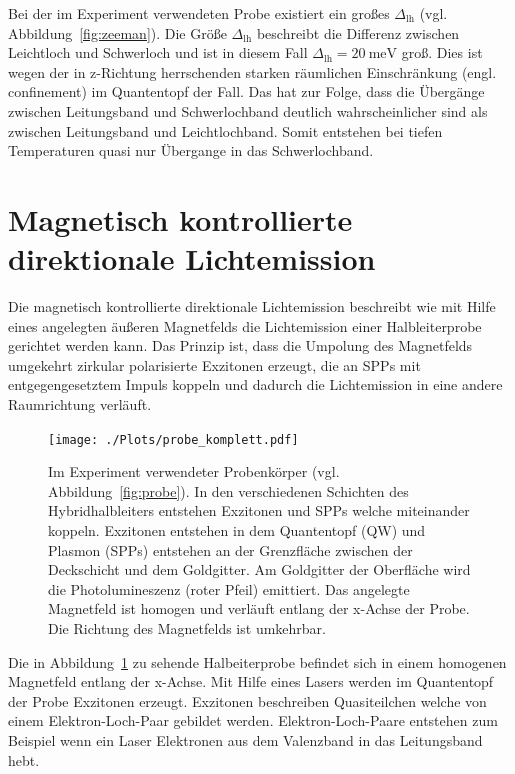 Bei der im Experiment verwendeten Probe existiert ein großes $\Delta_\text{lh}$ (vgl. Abbildung~\ref{fig:zeeman}).
Die Größe $\Delta_\text{lh}$ beschreibt die Differenz zwischen Leichtloch und Schwerloch und ist
in diesem Fall $\Delta_\text{lh}= \SI{20}{\milli\eV}$ groß.
Dies ist wegen der in z-Richtung herrschenden starken räumlichen Einschränkung (engl. confinement) im Quantentopf der Fall.
Das hat zur Folge, dass die Übergänge zwischen Leitungsband und Schwerlochband deutlich
wahrscheinlicher sind als zwischen Leitungsband und Leichtlochband. Somit entstehen bei tiefen Temperaturen quasi nur 
Übergange in das Schwerlochband.


\section{Magnetisch kontrollierte direktionale Lichtemission}\label{sec:pl}
Die magnetisch kontrollierte direktionale Lichtemission
beschreibt wie mit Hilfe eines angelegten äußeren Magnetfelds die Lichtemission
einer Halbleiterprobe gerichtet werden kann.
Das Prinzip ist, dass die Umpolung des Magnetfelds 
umgekehrt zirkular polarisierte Exzitonen erzeugt, die an SPPs mit entgegengesetztem Impuls 
koppeln und dadurch die Lichtemission in eine andere Raumrichtung verläuft.
\begin{figure}
    \centering
    \texttt{[image: ./Plots/probe\_komplett.pdf]}
    \caption{Im Experiment verwendeter Probenkörper (vgl. Abbildung~\ref{fig:probe}).
    In den verschiedenen Schichten des Hybridhalbleiters entstehen Exzitonen und SPPs 
    welche miteinander koppeln. 
    Exzitonen entstehen in dem Quantentopf (QW) und Plasmon (SPPs) entstehen an der Grenzfläche
    zwischen der Deckschicht und dem Goldgitter.
    Am Goldgitter der Oberfläche wird die Photolumineszenz (roter Pfeil)
    emittiert. 
    Das angelegte Magnetfeld ist homogen und verläuft entlang der x-Achse der Probe.
    Die Richtung des Magnetfelds ist umkehrbar.}
    \label{fig:komplett}
\end{figure}
\FloatBarrier

Die in Abbildung~\ref{fig:komplett} zu sehende Halbeiterprobe befindet sich 
in einem homogenen Magnetfeld entlang der x-Achse.
Mit Hilfe eines Lasers werden im Quantentopf der Probe Exzitonen erzeugt.
Exzitonen beschreiben Quasiteilchen welche von einem Elektron-Loch-Paar gebildet werden.
Elektron-Loch-Paare entstehen zum Beispiel wenn ein Laser 
Elektronen aus dem Valenzband in das Leitungsband hebt.\cite{jens}

